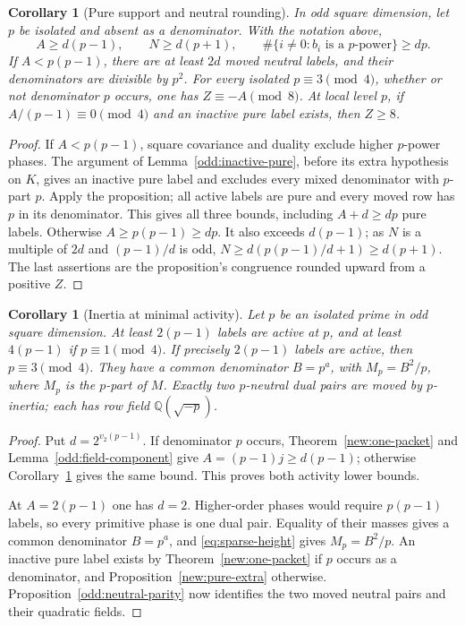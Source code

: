 \documentclass[11pt]{amsart}
\numberwithin{equation}{section}
\newtheorem{corollary}[theorem]{Corollary}
\theoremstyle{definition}
\theoremstyle{plain}
\newcommand{\QQ}{\mathbb Q}
\begin{document}
\begin{corollary}[Pure support and neutral rounding]
\label{odd:isolated-dyadic-cost}\label{odd:fourfold-neutral}
In odd square dimension, let $p$ be isolated and absent as a
denominator. With the notation above,
\[
 A\ge d(p-1),\qquad N\ge d(p+1),\qquad
 \#\{i\ne0:b_i\text{ is a $p$-power}\}\ge dp.
\]
If $A<p(p-1)$, there are at least $2d$ moved neutral labels,
and their denominators are divisible by $p^2$.
For every isolated $p\equiv3\pmod4$, whether or not denominator
$p$ occurs, one has $Z\equiv-A\pmod8$. At local level $p$, if
$A/(p-1)\equiv0\pmod4$ and an inactive pure label exists, then $Z\ge8$.
\end{corollary}
\begin{proof}
If $A<p(p-1)$, square covariance and duality exclude higher
$p$-power phases. The argument of Lemma~\ref{odd:inactive-pure},
before its extra hypothesis on $K$, gives an inactive pure label
and excludes every mixed denominator with $p$-part $p$.
Apply the proposition; all active labels are pure and every moved
row has $p$ in its denominator. This gives all three bounds,
including $A+d\ge dp$ pure labels.
Otherwise $A\ge p(p-1)\ge dp$. It also exceeds $d(p-1)$;
as $N$ is a multiple of $2d$ and $(p-1)/d$ is odd,
$N\ge d(p(p-1)/d+1)\ge d(p+1)$. The last assertions are the
proposition's congruence rounded upward from a positive $Z$.
\end{proof}

\begin{corollary}[Inertia at minimal activity]\label{r4:sparse-inertia}
Let $p$ be an isolated prime in odd square dimension. At least
$2(p-1)$ labels are active at $p$, and at least $4(p-1)$ if
$p\equiv1\pmod4$. If precisely $2(p-1)$ labels are active, then
$p\equiv3\pmod4$. They have a common denominator $B=p^a$, with
$M_p=B^2/p$, where $M_p$ is the $p$-part of $M$. Exactly two
$p$-neutral dual pairs are moved by $p$-inertia; each has row
field $\QQ(\sqrt{-p})$.
\end{corollary}
\begin{proof}
Put $d=2^{v_2(p-1)}$. If denominator $p$ occurs, Theorem~\ref{new:one-packet}
and Lemma~\ref{odd:field-component} give $A=(p-1)j\ge d(p-1)$;
otherwise Corollary~\ref{odd:isolated-dyadic-cost} gives the same
bound. This proves both activity lower bounds.

At $A=2(p-1)$ one has $d=2$. Higher-order phases would require
$p(p-1)$ labels, so every primitive phase is one dual pair.
Equality of their masses gives a common denominator $B=p^a$,
and \eqref{eq:sparse-height} gives $M_p=B^2/p$.
An inactive pure label exists by Theorem~\ref{new:one-packet} if
$p$ occurs as a denominator, and Proposition~\ref{new:pure-extra}
otherwise. Proposition~\ref{odd:neutral-parity} now identifies the
two moved neutral pairs and their quadratic fields.
\end{proof}
\end{document}
